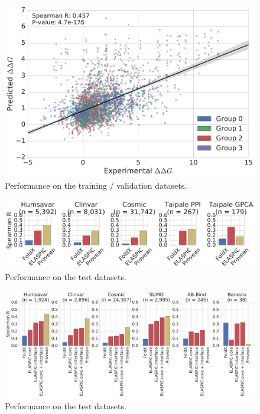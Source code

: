 \begin{figure}[ht]
	\centering
	\includegraphics[width=1.0\linewidth]{static/elaspic_training_set/validation/crossvalidation_performance_interface.pdf}
	\caption{Performance on the training / validation datasets.}
\end{figure}

\begin{figure}[ht]
	\centering
	\includegraphics[width=1.0\textwidth]{static/elaspic_training_set/validation/validation_performance_interface.pdf}
	\caption{Performance on the test datasets.}
\end{figure}

\begin{figure}[ht]
	\centering
	\includegraphics[width=1.0\textwidth]{static/elaspic_training_set/validation/test_performance_interface.pdf}
	\caption{Performance on the test datasets.}
\end{figure}

